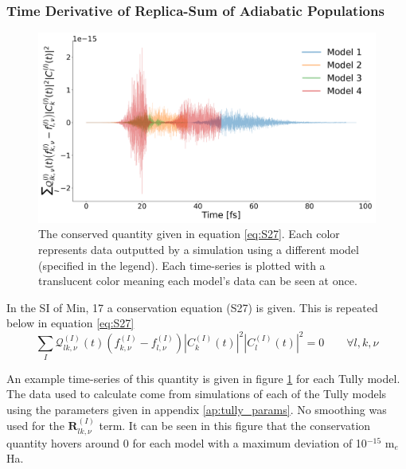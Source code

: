 \subsubsection{Time Derivative of Replica-Sum of Adiabatic Populations}
\begin{figure}[ht]
	\includegraphics[width=\textwidth]{./img/CTMQC/TullyModels/CTMQC_S27.png}
	\caption{\label{fig:S27}The conserved quantity given in equation \eqref{eq:S27}. Each color represents data outputted by a simulation using a different model (specified in the legend). Each time-series is plotted with a translucent color meaning each model's data can be seen at once.}
\end{figure}

In the SI of Min, 17 \cite{min_ab_2017} a conservation equation (S27) is given. This is repeated below in equation \eqref{eq:S27}
\begin{equation}
	\sum_{I} \mathcal{Q}_{lk, \nu}^{(I)}(t) \left( f_{k, \nu}^{(I)} - f_{l, \nu}^{(I)} \right) |C_{k}^{(I)} (t)|^2 |C_{l}^{(I)} (t)|^2 = 0  \qquad \forall l, k, \nu
	\label{eq:S27}
\end{equation}

An example time-series of this quantity is given in figure \ref{fig:S27} for each Tully model. The data used to calculate come from simulations of each of the Tully models using the parameters given in appendix \ref{ap:tully_params}. No smoothing was used for the $\mathbf{R}_{lk, \nu}^{(I)}$ term. It can be seen in this figure that the conservation quantity hovers around 0 for each model with a maximum deviation of 10$^{-15}$ m$_{e}$Ha.

